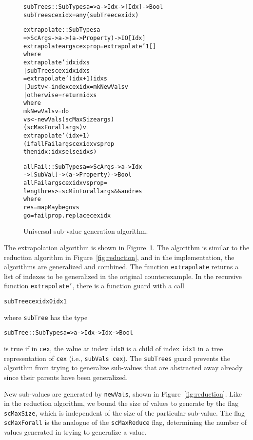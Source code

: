 \documentclass{sigplanconf}
\newenvironment{code}{\begin{alltt}}{\end{alltt}}
\newcommand{\ttp}[1]{\texttt{#1}}
\begin{document}
\begin{figure}
  \begin{code}
subTrees :: SubTypes a => a -> Idx -> [Idx] -> Bool
subTrees cex idx = any (subTree cex idx)

extrapolate :: SubTypes a
  => ScArgs -> a -> (a -> Property) -> IO [Idx]
extrapolate args cex prop = extrapolate' 1 []
  where
  extrapolate' idx idxs
    | subTrees cex idx idxs
    = extrapolate' (idx+1) idxs
    | Just v <- index cex idx = mkNewVals v
    | otherwise = return idxs
    where
    mkNewVals v = do
      vs <- newVals (scMaxSize args)
                    (scMaxForall args) v
      extrapolate' (idx+1)
        (if allFail args cex idx vs prop
           then idx:idxs else idxs)

allFail :: SubTypes a => ScArgs -> a -> Idx
  -> [SubVal] -> (a -> Property) -> Bool
allFail args cex idx vs prop =
  length res >= scMinForall args && and res
  where
  res  = mapMaybe go vs
  go   = fail prop . replace cex idx
  \end{code}
  \caption{Universal sub-value generation algorithm.}
  \label{fig:universal}
\end{figure}

The extrapolation algorithm is shown in Figure~\ref{fig:universal}.  The
algorithm is similar to the reduction algorithm in Figure~\ref{fig:reduction},
and in the implementation, the algorithms are generalized and combined.  The
function \ttp{extrapolate} returns a list of indexes to be generalized in the
original counterexample.  In the recursive function \ttp{extrapolate'}, there is
a function guard with a call
%
\begin{code}
subTree cex idx0 idx1
\end{code}
%
\noindent
where \ttp{subTree} has the type
%
\begin{code}
subTree :: SubTypes a => a -> Idx -> Idx -> Bool
\end{code}
%
\noindent
is true if in \ttp{cex}, the value at index \ttp{idx0} is a child of index
\ttp{idx1} in a tree representation of \ttp{cex} (i.e., \ttp{subVals cex}).  The
\ttp{subTrees} guard prevents the algorithm from trying to generalize sub-values
that are abstracted away already since their parents have been generalized.

New sub-values are generated by \ttp{newVals}, shown in
Figure~\ref{fig:reduction}.  Like in the reduction algorithm, we bound the size
of values to generate by the flag \ttp{scMaxSize}, which is independent of the
size of the particular sub-value.  The flag \ttp{scMaxForall} is the analogue of
the \ttp{scMaxReduce} flag, determining the number of values generated in trying
to generalize a value.
\end{document}
